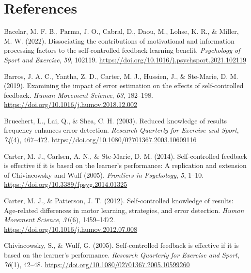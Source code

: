 \documentclass[
  doc, donotrepeattitle,floatsintext]{apa7}
\newlength{\cslhangindent}
\newlength{\cslentryspacingunit} %
\newenvironment{CSLReferences}[2] %
 {%
  \setlength{\parindent}{0pt}
  \ifodd #1
  \let\oldpar\par
  \def\par{\hangindent=\cslhangindent\oldpar}
  \fi
  \setlength{\parskip}{#2\cslentryspacingunit}
 }%
 {}
\begin{document}
\clearpage

\hypertarget{references}{%
\section{References}\label{references}}

\vspace{2ex}

\hypertarget{refs}{}
\begin{CSLReferences}{1}{0}
\leavevmode{}%
Bacelar, M. F. B., Parma, J. O., Cabral, D., Daou, M., Lohse, K. R., \& Miller, M. W. (2022). Dissociating the contributions of motivational and information processing factors to the self-controlled feedback learning benefit. \emph{Psychology of Sport and Exercise}, \emph{59}, 102119. \url{https://doi.org/10.1016/j.psychsport.2021.102119}

\leavevmode{}%
Barros, J. A. C., Yantha, Z. D., Carter, M. J., Hussien, J., \& Ste-Marie, D. M. (2019). Examining the impact of error estimation on the effects of self-controlled feedback. \emph{Human Movement Science}, \emph{63}, 182--198. \url{https://doi.org/10.1016/j.humov.2018.12.002}

\leavevmode{}%
Bruechert, L., Lai, Q., \& Shea, C. H. (2003). Reduced knowledge of results frequency enhances error detection. \emph{Research Quarterly for Exercise and Sport}, \emph{74}(4), 467--472. \url{https://doi.org/10.1080/02701367.2003.10609116}

\leavevmode{}%
Carter, M. J., Carlsen, A. N., \& Ste-Marie, D. M. (2014). Self-controlled feedback is effective if it is based on the learner's performance: A replication and extension of {Chiviacowsky} and {Wulf} (2005). \emph{Frontiers in Psychology}, \emph{5}, 1--10. \url{https://doi.org/10.3389/fpsyg.2014.01325}

\leavevmode{}%
Carter, M. J., \& Patterson, J. T. (2012). Self-controlled knowledge of results: {Age-related} differences in motor learning, strategies, and error detection. \emph{Human Movement Science}, \emph{31}(6), 1459--1472. \url{https://doi.org/10.1016/j.humov.2012.07.008}

\leavevmode{}%
Chiviacowsky, S., \& Wulf, G. (2005). Self-controlled feedback is effective if it is based on the learner's performance. \emph{Research Quarterly for Exercise and Sport}, \emph{76}(1), 42--48. \url{https://doi.org/10.1080/02701367.2005.10599260}


\end{CSLReferences}
\end{document}
